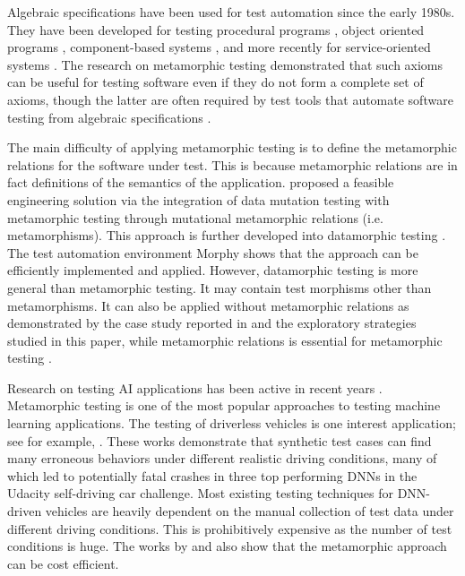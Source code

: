\documentclass[preprint,1p,authoryear,times]{elsarticle}
\begin{document}
Algebraic specifications have been used for test automation since the early 1980s. They have been developed for testing procedural programs \citep{GMH81,BGM91}, object oriented programs \citep{DoF94, HuS96, TACCLE2001, BlackAndWhite98}, component-based systems \citep{KongZZ07,YuKZZ08}, and more recently for service-oriented systems \citep{MonicTest2016}. The research on metamorphic testing demonstrated that such axioms can be useful for testing software even if they do not form a complete set of axioms, though the latter are often required by test tools that automate software testing from algebraic specifications \citep{TACCLE2001, BlackAndWhite98}. 

The main difficulty of applying metamorphic testing is to define the metamorphic relations for the software under test. This is because metamorphic relations are in fact definitions of the semantics of the application. \citet{Zhu2015JFuzz} proposed a feasible engineering solution via the integration of data mutation testing with metamorphic testing through mutational metamorphic relations (i.e. metamorphisms). This approach is further developed into datamorphic testing \citep{DatamorphicTR2019,AITest2020TR}. The test automation environment Morphy shows that the approach can be efficiently implemented and applied. However, datamorphic testing is more general than metamorphic testing. It may contain test morphisms other than metamorphisms. It can also be applied without metamorphic relations as demonstrated by the case study reported in \citep{AITest2020} and the exploratory strategies studied in this paper, while metamorphic relations is essential for metamorphic testing \citep{MetamorphicTestingSurveyChen2018}. 

Research on testing AI applications has been active in recent years \citep{AST2018Proc, AITest2019Proc, AITest2020Proc}. Metamorphic testing is one of the most popular approaches to testing machine learning applications. The testing of driverless vehicles is one interest application; see for example, \citep{DeepTest2018, Zhou2019DriverlessCar}. These works demonstrate that synthetic test cases can find many erroneous behaviors under different realistic driving conditions, many of which led to potentially fatal crashes in three top performing DNNs in the Udacity self-driving car challenge. Most existing testing techniques for DNN-driven vehicles are heavily dependent on the manual collection of test data under different driving conditions. This is prohibitively expensive as the number of test conditions is huge. The works by \citet{DeepTest2018} and \citet{Zhou2019DriverlessCar} also show that the metamorphic approach can be cost efficient. 
\end{document}
